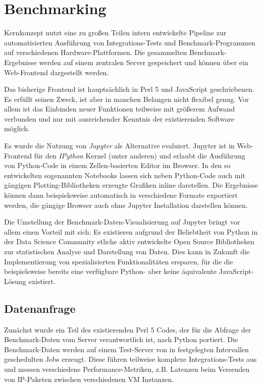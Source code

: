 \section{Benchmarking}

Kernkonzept nutzt eine zu großen Teilen intern entwickelte Pipeline zur
automatisierten Ausführung von Integrations-Tests und Benchmark-Programmen
auf verschiedenen Hardware-Plattformen.
Die gesammelten Benchmark-Ergebnisse werden auf einem zentralen Server
gespeichert und können über ein Web-Frontend dargestellt werden.

Das bisherige Frontend ist hauptsächlich in Perl 5 und JavaScript
geschriebenen. Es erfüllt seinen Zweck, ist aber in manchen Belangen nicht
flexibel genug. Vor allem ist das Einbinden neuer Funktionen teilweise mit
größerem Aufwand verbunden und nur mit ausreichender Kenntnis der
existierenden Software möglich.

Es wurde die Nutzung von \textit{Jupyter} als Alternative evaluiert. Jupyter
ist in Web-Frontend für den \textit{IPython} Kernel (unter anderen) und erlaubt
die Ausführung von Python-Code in einem Zellen-basierten Editor im Browser. In
den so entwickelten sogenannten Notebooks lassen sich neben Python-Code auch
mit gängigen Plotting-Bibliotheken erzeugte Grafiken inline darstellen. Die
Ergebnisse können dann beispielsweise automatisch in verschiedene Formate
exportiert werden, die gängige Browser auch ohne Jupyter Installation
darstellen können.

Die Umstellung der Benchmark-Daten-Visualisierung auf Jupyter bringt vor allem
einen Vorteil mit sich: Es existieren aufgrund der Beliebtheit von Python in
der Data Science Community etliche aktiv entwickelte Open Source Bibliotheken
zur statistischen Analyse und Darstellung von Daten. Dies kann in Zukunft die
Implementierung von spezialisierten Funktionalitäten ersparen, für die die
beispielsweise bereits eine verfügbare Python- aber keine äquivalente
JavaScript-Lösung existiert.

\subsection{Datenanfrage}

Zunächst wurde ein Teil des existierenden Perl 5 Codes, der für die Abfrage der
Benchmark-Daten vom Server verantwortlich ist, nach Python portiert.  Die
Benchmark-Daten werden auf einem Test-Server von in festgelegten Intervallen
geschedulten Jobs erzeugt.  Diese führen teilweise komplexe Integrations-Tests
aus und messen verschiedene Performance-Metriken, z.B. Latenzen beim Versenden
von IP-Paketen zwischen verschiedenen VM Instanzen.

